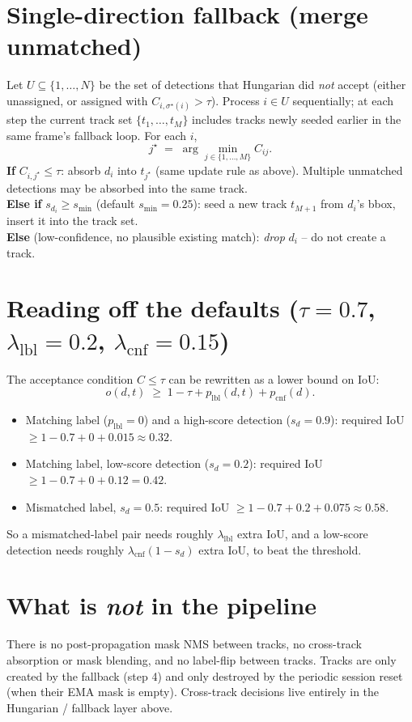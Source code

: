 \documentclass[11pt]{article}
\begin{document}
\section*{Single-direction fallback (merge unmatched)}
Let $U \subseteq \{1,\ldots,N\}$ be the set of detections that Hungarian did
\emph{not} accept (either unassigned, or assigned with $C_{i,\sigma^\star(i)}
> \tau$). Process $i \in U$ sequentially; at each step the current track set
$\{t_1,\ldots,t_M\}$ includes tracks newly seeded earlier in the same
frame's fallback loop. For each $i$,
\begin{equation}
    j^\star \;=\; \arg\min_{j \in \{1,\ldots,M\}} C_{ij}.
\end{equation}
\textbf{If} $C_{i,j^\star} \le \tau$: absorb $d_i$ into $t_{j^\star}$ (same
update rule as above). Multiple unmatched detections may be absorbed into
the same track.\\
\textbf{Else if} $s_{d_i} \ge s_{\min}$ (default $s_{\min} = 0.25$): seed a
new track $t_{M+1}$ from $d_i$'s bbox, insert it into the track set.\\
\textbf{Else} (low-confidence, no plausible existing match): \emph{drop}
$d_i$ -- do not create a track.

\section*{Reading off the defaults ($\tau = 0.7$, $\lambda_{\text{lbl}} = 0.2$,
$\lambda_{\text{cnf}} = 0.15$)}
The acceptance condition $C \le \tau$ can be rewritten as a lower bound on
IoU:
\begin{equation}
    o(d, t) \;\ge\; 1 - \tau + p_{\text{lbl}}(d, t) + p_{\text{cnf}}(d).
\end{equation}
\begin{itemize}
    \item Matching label ($p_{\text{lbl}} = 0$) and a high-score detection
          ($s_d = 0.9$): required IoU $\ge 1 - 0.7 + 0 + 0.015 \approx 0.32$.
    \item Matching label, low-score detection ($s_d = 0.2$):
          required IoU $\ge 1 - 0.7 + 0 + 0.12 = 0.42$.
    \item Mismatched label, $s_d = 0.5$: required IoU $\ge 1 - 0.7 + 0.2 +
          0.075 \approx 0.58$.
\end{itemize}
So a mismatched-label pair needs roughly $\lambda_{\text{lbl}}$ extra IoU,
and a low-score detection needs roughly $\lambda_{\text{cnf}} (1 - s_d)$
extra IoU, to beat the threshold.

\section*{What is \emph{not} in the pipeline}
There is no post-propagation mask NMS between tracks, no cross-track
absorption or mask blending, and no label-flip between tracks. Tracks are
only created by the fallback (step 4) and only destroyed by the periodic
session reset (when their EMA mask is empty). Cross-track decisions live
entirely in the Hungarian / fallback layer above.
\end{document}
